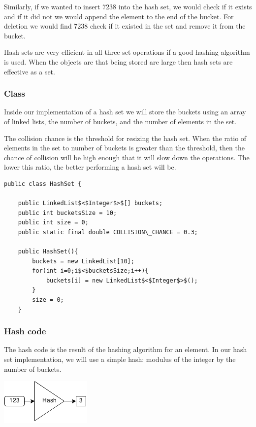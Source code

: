 \documentclass[11pt,oneside]{book}
\makeatletter
\def\maxwidth#1{\ifdim\Gin@nat@width>#1 #1\else\Gin@nat@width\fi}
\makeatother
\begin{document}
Similarly, if we wanted to insert 7238 into the hash set, we would check if it exists and if it did not we would append the element to the end of the bucket. For deletion we would find 7238 check if it existed in the set and remove it from the bucket.

Hash sets are very efficient in all three set operations if a good hashing algorithm is used. When the objects are that being stored are large then hash sets are effective as a set.

\subsubsection{Class}

Inside our implementation of a hash set we will store the buckets using an array of linked lists, the number of buckets, and the number of elements in the set.

The collision chance is the threshold for resizing the hash set. When the ratio of elements in the set to number of buckets is greater than the threshold, then the chance of collision will be high enough that it will slow down the operations. The lower this ratio, the better performing a hash set will be.

\begin{lstlisting}
public class HashSet {

    public LinkedList$<$Integer$>$[] buckets;
    public int bucketsSize = 10;
    public int size = 0;
    public static final double COLLISION\_CHANCE = 0.3;
    
    public HashSet(){
        buckets = new LinkedList[10];
        for(int i=0;i$<$bucketsSize;i++){
            buckets[i] = new LinkedList$<$Integer$>$();
        }
        size = 0;
    }
\end{lstlisting}

\subsubsection{Hash code}

The hash code is the result of the hashing algorithm for an element. In our hash set implementation, we will use a simple hash: modulus of the integer by the number of buckets.

\includegraphics[width=\maxwidth{\textwidth}]{hashcode.png}
\end{document}

